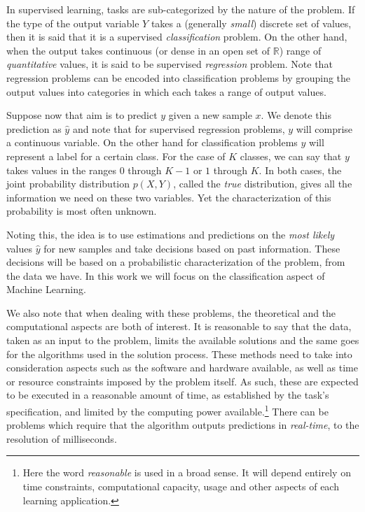 In supervised learning, tasks are sub-categorized by the nature of the problem.
If the type of the output variable $Y$ takes a (generally \textit{small}) discrete set of values, then it is said that it is a supervised \textit{classification} problem.
On the other hand, when the output takes continuous (or dense in an open set of $\mathbb{R}$) range of \textit{quantitative} values, it is said to be supervised \textit{regression} problem.
Note that regression problems can be encoded into classification problems by grouping the output values into categories in which each takes a range of output values.

Suppose now that aim is to predict $y$ given a new sample $x$.
We denote this prediction as $\hat{y}$ and note that for supervised regression problems, $y$ will comprise a continuous variable.
On the other hand for classification problems $y$ will represent a label for a certain class.
For the case of $K$ classes, we can say that $y$ takes values in the ranges $0$ through $K-1$ or $1$ through $K$.
In both cases, the joint probability distribution $p(X, Y)$, called the \textit{true} distribution, gives all the information we need on these two variables.
Yet the characterization of this probability is most often unknown.

Noting this, the idea is to use estimations and predictions on the \textit{most likely} values $\hat{y}$ for new samples and take decisions based on past information.
These decisions will be based on a probabilistic characterization of the problem, from the data we have.
In this work we will focus on the classification aspect of Machine Learning.

We also note that when dealing with these problems, the theoretical and the computational aspects are both of interest.
It is reasonable to say that the data, taken as an input to the problem, limits the available solutions and the same goes for the algorithms used in the solution process.
These methods need to take into consideration aspects such as the software and hardware available, as well as time or resource constraints imposed by the problem itself.
As such, these are expected to be executed in a reasonable amount of time, as established by the task's specification, and limited by the computing power available.\footnote{Here the word \textit{reasonable} is used in a broad sense.
It will depend entirely on time constraints, computational capacity, usage and other aspects of each learning application.} There can be problems which require that the algorithm outputs predictions in \textit{real-time}, to the resolution of milliseconds.

